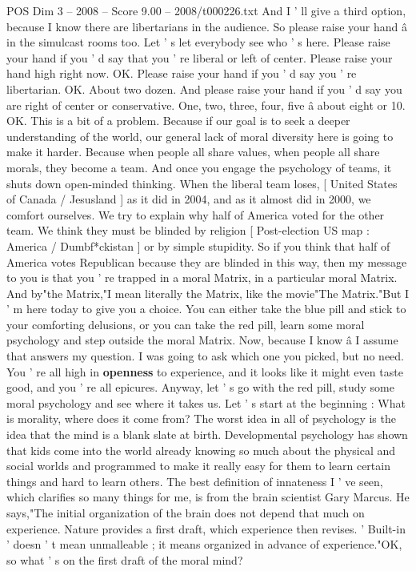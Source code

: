 \begin{textsample}{POS Dim 3 – 2008 – Score 9.00 – 2008/t000226.txt}
And I ' ll give a third option, because I know there are libertarians in the audience.
So please raise your hand â in the simulcast rooms too.
Let ' s let everybody see who ' s here.
Please raise your hand if you ' d say that you ' re liberal or left of center.
Please raise your hand high right now.
OK.
Please raise your hand if you ' d say you ' re libertarian.
OK.
About two dozen.
And please raise your hand if you ' d say you are right of center or conservative.
One, two, three, four, five â about eight or 10.
OK.
This is a bit of a problem.
Because if our goal is to seek a deeper understanding of the world, our general lack of moral diversity here is going to make it harder.
Because when people all share values, when people all share morals, they become a team.
And once you engage the psychology of teams, it shuts down open-minded thinking.
When the liberal team loses, [ United States of Canada / Jesusland ] as it did in 2004, and as it almost did in 2000, we comfort ourselves.
We try to explain why half of America voted for the other team.
We think they must be blinded by religion [ Post-election US map : America / Dumbf*ckistan ] or by simple stupidity.
So if you think that half of America votes Republican because they are blinded in this way, then my message to you is that you ' re trapped in a moral Matrix, in a particular moral Matrix.
And by"the Matrix,"I mean literally the Matrix, like the movie"The Matrix."But I ' m here today to give you a choice.
You can either take the blue pill and stick to your comforting delusions, or you can take the red pill, learn some moral psychology and step outside the moral Matrix.
Now, because I know â I assume that answers my question.
I was going to ask which one you picked, but no need.
You ' re all high in \textbf{openness} to experience, and it looks like it might even taste good, and you ' re all epicures.
Anyway, let ' s go with the red pill, study some moral psychology and see where it takes us.
Let ' s start at the beginning : What is morality, where does it come from?
The worst idea in all of psychology is the idea that the mind is a blank slate at birth.
Developmental psychology has shown that kids come into the world already knowing so much about the physical and social worlds and programmed to make it really easy for them to learn certain things and hard to learn others.
The best definition of innateness I ' ve seen, which clarifies so many things for me, is from the brain scientist Gary Marcus.
He says,"The initial organization of the brain does not depend that much on experience.
Nature provides a first draft, which experience then revises. ' Built-in ' doesn ' t mean unmalleable ; it means organized in advance of experience."OK, so what ' s on the first draft of the moral mind?

\end{textsample}
